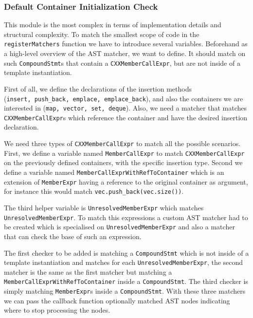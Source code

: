 \subsubsection{Default Container Initialization Check}
\par This module is the most complex in terms of implementation details and structural complexity. To match the smallest scope of code in the \verb|registerMatchers| function we have to introduce several variables. Beforehand as a high-level overview of the AST matcher, we want to define. It should match on such \verb|CompoundStmt|s that contain a \verb|CXXMemberCallExpr|, but are not inside of a template instantiation. \medskip
\par First of all, we define the declarations of the insertion methods \\(\verb|insert, push_back, emplace, emplace_back|), and also the containers we are interested in (\verb|map, vector, set, deque|). Also, we need a matcher that matches \verb|CXXMemberCallExpr|s which reference the container and have the desired insertion declaration. \medskip
\par We need three types of \verb|CXXMemberCallExpr| to match all the possible scenarios. First, we define a variable named \verb|MemberCallExpr| to match \verb|CXXMemberCallExpr| on the previously defined containers, with the specific insertion type. Second we define a variable named \verb|MemberCallExprWithRefToContainer| which is an extension of \verb|MemberExpr| having a reference to the original container as argument, for instance this would match \verb|vec.push_back(vec.size())|. \medskip
\par The third helper variable is \verb|UnresolvedMemberExpr| which matches \\\verb|UnresolvedMemberExpr|. To match this expressions a custom AST matcher had to be created which is specialised on \verb|UnresolvedMemberExpr| and also a matcher that can check the base of such an expression. \medskip
\par The first checker to be added is matching a \verb|CompoundStmt| which is not inside of a template instantiation and matches for each \verb|UnresolvedMemberExpr|, the second matcher is the same as the first matcher but matching a \\\verb|MemberCallExprWithRefToContainer| inside a \verb|CompoundStmt|. The third checker is simply matching \verb|MemberExpr|s inside a \verb|CompoundStmt|. With these three matchers we can pass the callback function optionally matched AST nodes indicating where to stop processing the nodes. \medskip
